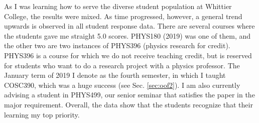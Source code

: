 \documentclass[../../main.tex]{subfiles}
\begin{document}
As I was learning how to serve the diverse student population at Whittier College, the results were mixed.  As time progressed, however, a general trend upwards is observed in all student response data.  There are several courses where the students gave me straight 5.0 scores.  PHYS180 (2019) was one of them, and the other two are two instances of PHYS396 (physics research for credit).  PHYS396 is a course for which we do not receive teaching credit, but is reserved for students who want to do a research project with a physics professor.  The January term of 2019 I denote as the fourth semester, in which I taught COSC390, which was a huge success (see Sec. \ref{sec:oof2}).  I am also currently advising a student in PHYS499, our senior seminar that satisfies the paper in the major requirement.  Overall, the data show that the students recognize that their learning my top priority.  \\ \hspace{0.1cm}
\end{document}
